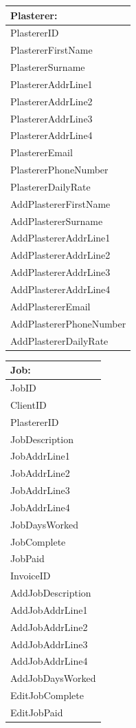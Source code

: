 \begin{tabular}{|p{5cm}|}
	\hline
	\textbf{Plasterer:} \\ \hline
		PlastererID \\
		PlastererFirstName \\
		PlastererSurname \\
		PlastererAddrLine1 \\
		PlastererAddrLine2 \\
		PlastererAddrLine3 \\
		PlastererAddrLine4 \\
		PlastererEmail \\
		PlastererPhoneNumber \\
		PlastererDailyRate \\ \hline
		AddPlastererFirstName \\
		AddPlastererSurname \\
		AddPlastererAddrLine1 \\
		AddPlastererAddrLine2 \\
		AddPlastererAddrLine3 \\
		AddPlastererAddrLine4 \\
		AddPlastererEmail \\
		AddPlastererPhoneNumber \\
		AddPlastererDailyRate \\ \hline
\end{tabular}

\begin{tabular}{|p{5cm}|}
	\hline
	\textbf{Job:} \\ \hline
		JobID \\
		ClientID \\
		PlastererID \\
		JobDescription \\
		JobAddrLine1 \\
		JobAddrLine2 \\
		JobAddrLine3 \\
		JobAddrLine4 \\
		JobDaysWorked \\
		JobComplete \\
		JobPaid \\ 
		InvoiceID \\ \hline
		AddJobDescription\\
		AddJobAddrLine1 \\
		AddJobAddrLine2 \\
		AddJobAddrLine3 \\
		AddJobAddrLine4 \\
		AddJobDaysWorked \\
		EditJobComplete \\
		EditJobPaid \\ \hline
\end{tabular}


